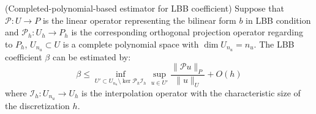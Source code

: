 \begin{thm}\label{thm:estimator}
(Completed-polynomial-based estimator for LBB coefficient)
Suppose that $\mathcal P: U\rightarrow P$ is the linear operator representing the bilinear form $b$ in LBB condition and $\mathcal P_h: U_h \rightarrow P_h$ is the corresponding orthogonal projection operator regarding to $P_h$,
$U_{n_u} \subset U$ is a complete polynomial space with $\dim U_{n_u} = n_u$. The LBB coefficient $\beta$ can be estimated by:
\begin{equation}
\beta \leq \inf_{U' \subset U_{n_u}\setminus \ker \mathcal P_h \mathcal I_h} \sup_{u \in U'} \frac{\| \mathcal P u\|_P}{\| u \|_U} + O(h) 
\end{equation}
where $\mathcal I_h: U_{n_u} \to U_h$ is the interpolation operator with the characteristic size of the discretization $h$.
\end{thm}
